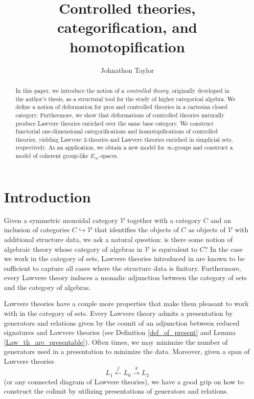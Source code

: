 \documentclass{tac}
\title{Controlled theories, categorification, and homotopification}
\author{Johnathon Taylor}
\begin{document}
\maketitle

\begin{abstract}
In this paper, we introduce the notion of a \emph{controlled theory}, originally
developed in the author's thesis, as a structural tool for
the study of higher categorical algebra. We define a notion of deformation for
pros and controlled theories in a cartesian closed category. Furthermore, we
show that deformations of controlled theories naturally produce Lawvere
theories enriched over the same base category. We construct functorial
one-dimensional categorifications and homotopifications of controlled theories,
yielding Lawvere $2$-theories and Lawvere theories enriched in simplicial sets,
respectively. As an application, we obtain a new model for $\infty$-groups and
construct a model of coherent group-like $E_\infty$-spaces.
\end{abstract}




\tableofcontents

\section{Introduction}
Given a symmetric monoidal category $\mathcal{V}$ together with a category $C$ and an inclusion of categories $C\hookrightarrow\mathcal{V}$ that identifies the objects of $C$ as objects of $\mathcal{V}$ with additional structure data, we ask a natural question: is there some notion of algebraic theory whose category of algebras in $\mathcal{V}$ is equivalent to $C$? In the case we work in the category of sets, Lawvere theories introduced in \cite{Law2} are known to be sufficient to capture all cases where the structure data is finitary. Furthermore, every Lawvere theory induces a monadic adjunction between the category of sets and the category of algebras. 

Lawvere theories have a couple more properties that make them pleasant to work with in the category of sets. Every Lawvere theory admits a presentation by generators and relations given by the counit of an adjunction between reduced signatures and Lawvere theories (see Definition \ref{def_of_present} and Lemma \ref{Law_th_are_presentable}). Often times, we may minimize the number of generators used in a presentation to minimize the data. Moreover, given a span of Lawvere theories
\[
L_1\xleftarrow{f}L_0\xrightarrow{g}L_2
\]
(or any connected diagram of Lawvere theories), we have a good grip on how to construct the colimit by utilizing presentations of generators and relations. 
\end{document}
